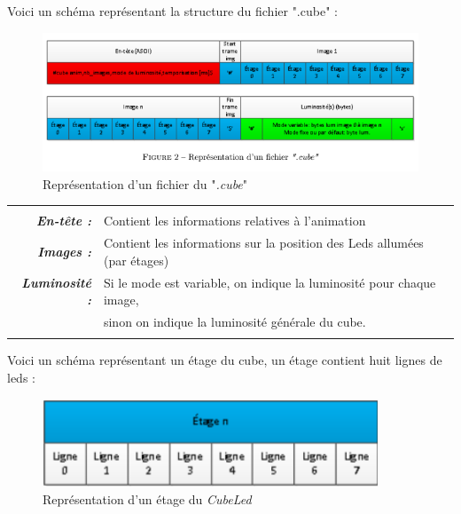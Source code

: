 \documentclass[a4paper,12pt]{article}
\begin{document}
\vspace{0.5cm}



\begin{flushleft}
	\noindent Voici un schéma représentant la structure du fichier ".cube" :
	\begin{figure}[htp]
		\centering
		\includegraphics[width=15cm, trim={0 1cm 0 0}, clip]{./img/structureCube.png}
		\caption{Représentation d'un fichier du "\emph{.cube}"}
		\label{structCube}
	\end{figure}
\end{flushleft}

\begin{center}
	\begin{tabular}{|r  l|}
		\hline
		 & \\
		\textbf{\emph{En-tête :}} & Contient les informations relatives à l'animation \\
		\textbf{\emph{Images :}} & Contient les informations sur la position des Leds allumées (par étages) \\
		\textbf{\emph{Luminosité :}} & Si le mode est variable, on indique la luminosité pour chaque image,\\
		 & sinon on indique la luminosité générale du cube. \\
		 & \\
		\hline
	\end{tabular}
\end{center}

\noindent Voici un schéma représentant un étage du cube, un étage contient huit lignes de leds :
\begin{figure}[htp]
	\centering
	\includegraphics[width=10cm]{./img/structureEtage.png}
	\caption{Représentation d'un étage du \emph{CubeLed}}
	\label{cubeFloor}
\end{figure}
\end{document}

